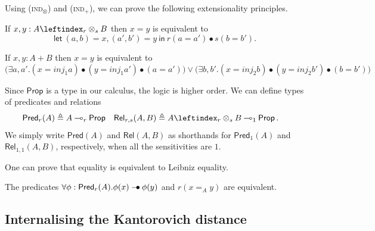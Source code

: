 \documentclass[a4paper,UKenglish,cleveref, autoref, thm-restate]{lipics-v2021}
\newcommand{\lol}{\mathbin{\multimap}}
\newcommand{\mprod}{\otimes}
\newcommand{\pair}[2]{\otimes_{#1,#2}}
\renewcommand{\pair}[2]{\leftindex_{#1}\otimes_{#2}} %
\newcommand{\inj}{\mathsf{\mathit{inj}}}
\newcommand{\scaling}{}
\newcommand{\letIn}[2]{\mathsf{let~} #1 \mathsf{~in~} #2}
\newcommand{\Prop}{\mathsf{Prop}}
\newcommand{\ltensor}{*}
\renewcommand{\ltensor}{\bullet}
\newcommand{\lexp}{\mathbin{{-}\kern-.2em\raisebox{0ex}{$*$}}}
\renewcommand{\lexp}{\mathbin{{-}\kern-.2em\raisebox{0ex}{$\bullet$}}}
\newcommand{\Rel}[2]{\mathsf{Rel}(#1,#2)}
\newcommand{\RelQ}[4]{\mathsf{Rel}_{#3,#4}(#1,#2)}
\newcommand{\Pred}[1]{\mathsf{Pred}(#1)}
\newcommand{\PredQ}[2]{\mathsf{Pred}_{#2}(#1)}
\newcommand{\peq}{=}
\newcommand{\defeq}{\triangleq}
\begin{document}
Using (\textsc{ind}${}_\mprod$) and (\textsc{ind}${}_+$), we can prove 
the following extensionality principles.

\begin{lemma} \label{lem:ext:tensor}
 If $x,y : A \pair{r}{s} B$ then $x \peq y$ is equivalent to 
 \[\letIn{(a,b) = x, (a',b') = y}{r\scaling(a\peq a') \ltensor s (b \peq b')}.\] 
\end{lemma}
\begin{lemma} \label{lem:ext:sum}
 If $x,y : A + B$ then $x \peq y$ is equivalent to 
\begin{equation*}
\big(\exists a,a'. (x \peq \inj_1 a) \ltensor (y \peq \inj_1 a') \ltensor (a \peq a')\big)
\vee 
\big(\exists b,b'. (x \peq \inj_2 b) \ltensor (y \peq \inj_2 b') \ltensor (b \peq b')\big)
\end{equation*}
\end{lemma}



Since $\Prop$ is a type in our calculus, the logic is higher order. We can define types of predicates
and relations
\begin{align}
 \PredQ Ar & \defeq A \lol_r \Prop & %
 \RelQ ABrs & \defeq A \pair rs B\lol_1 \Prop \,.
 \label{eq:Rel}
\end{align}
We simply write $\Pred A$ and $\Rel AB$
as shorthands for $\PredQ A1$ and $\RelQ AB11$, respectively, when all the sensitivities are $1$.

One can prove that equality is equivalent to Leibniz equality. 
\begin{proposition} \label{prop:Leibniz}
 The predicates $\forall \phi : \PredQ Ar . \phi(x) \lexp \phi(y)$ and $r(x \peq_A y)$ are equivalent. 
\end{proposition}

\subsection{Internalising the Kantorovich distance}

\newcommand{\eq}{\mathsf{eq}}
\end{document}
